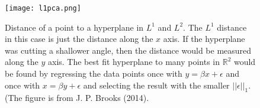 \begin{figure}
\centering
    \texttt{[image: l1pca.png]}
    \caption{Distance of a point to a hyperplane in $L^1$ and $L^2$. The $L^1$ distance in this case is just the distance along the $x$ axis. If the hyperplane was cutting a shallower angle, then the distance would be measured along the $y$ axis. The best fit hyperplane to many points in $\mathbb{R}^2$ would be found by regressing the data points once with $y = \beta x + \epsilon$ and once with $x = \beta y + \epsilon$ and selecting the result with the smaller $||\epsilon||_1$. (The figure is from J. P. Brooks (2014).}
    \label{fig:l1pca}
\end{figure}
